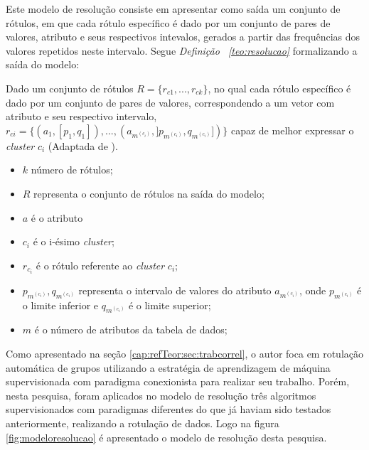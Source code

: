 Este modelo de resolução consiste em apresentar como saída um conjunto de rótulos, em que cada rótulo específico é dado por um conjunto de pares de valores, atributo e seus respectivos intevalos, gerados a partir das frequências dos valores repetidos neste intervalo. Segue \textit{Definição ~\ref{teo:resolucao}} formalizando a saída do modelo:
    \begin{teorema}
    Dado um conjunto de rótulos ${ R=\{ r_{c1},...,r_{ck} \} }$, no qual cada rótulo específico é dado por um conjunto de pares de valores, correspondendo a um vetor com atributo e seu respectivo intervalo, ${ r_{ci}=\{ (a_1,[p_1,q_1]),...,(a_{m^{(c_i)}}, ]p_{m^{(c_i)}},q_{m^{(c_i)}}]) \} }$ capaz de melhor expressar o \textit{cluster} ${c_i}$ (Adaptada de \cite{Lopes2016}).
        \begin{itemize}[noitemsep]
            \item ${k}$ número de rótulos;
            \item ${R}$ representa o conjunto de rótulos na saída do modelo;
            \item ${a}$ é o atributo
            \item ${c_i}$ é o i-ésimo \textit{cluster};
            \item ${r_{c_i}}$ é o rótulo referente ao \textit{cluster} ${c_i}$;
            \item ${p_{m^{(c_i)}},q_{m^{(c_i)}}}$ representa o intervalo de valores do atributo ${a_{m^{(c_i)}} }$, onde ${ p_{m^{(c_i)}} }$  é o limite inferior e ${ q_{m^{(c_i)}} }$ é o limite superior;
            \item ${m}$ é o número de atributos da tabela de dados;
        \end{itemize}
    \label{teo:resolucao}
    \end{teorema}

Como apresentado na seção \ref{cap:refTeor:sec:trabcorrel}, o autor \cite{Lopes2016} foca em rotulação automática de grupos utilizando a estratégia de aprendizagem de máquina supervisionada com paradigma conexionista para realizar seu trabalho. Porém, nesta pesquisa, foram aplicados no modelo de resolução três algoritmos supervisionados com paradigmas diferentes do que já haviam sido testados anteriormente, realizando a rotulação de dados. Logo na figura \ref{fig:modeloresolucao} é apresentado o modelo de resolução desta pesquisa.



